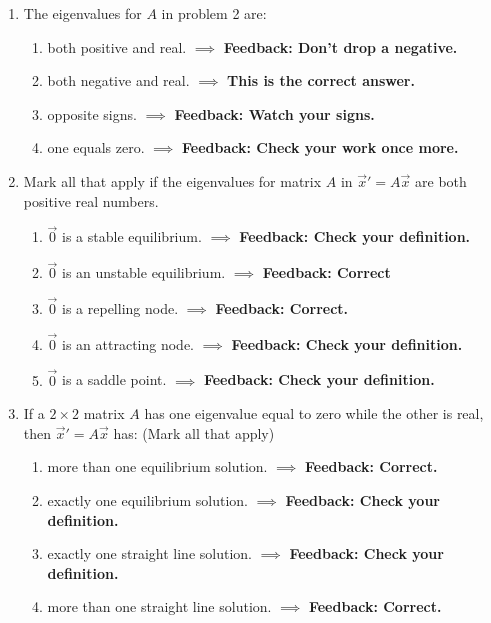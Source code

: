 \documentclass[11pt]{article}
\begin{document}
\begin{enumerate}
	\item The eigenvalues for $A$ in problem 2 are:
	\begin{enumerate}
		\item both positive and real. $\implies$ \textbf{Feedback: Don't drop a negative.}
		\item both negative and real. $\implies$ \textbf{This is the correct answer.}
		\item opposite signs. $\implies$ \textbf{Feedback: Watch your signs.}
		\item one equals zero. $\implies$ \textbf{Feedback: Check your work once more.}
	\end{enumerate}
	\item Mark all that apply if the eigenvalues for matrix $A$ in $\vec{x}' = A\vec{x}$ are both positive real numbers.
	\begin{enumerate}
		\item $\vec{0}$ is a stable equilibrium. $\implies$ \textbf{Feedback: Check your definition.}
		\item $\vec{0}$ is an unstable equilibrium. $\implies$ \textbf{Feedback: Correct}
		\item $\vec{0}$ is a repelling node. $\implies$ \textbf{Feedback: Correct.}
		\item $\vec{0}$ is an attracting node. $\implies$ \textbf{Feedback: Check your definition.}
		\item $\vec{0}$ is a saddle point. $\implies$ \textbf{Feedback: Check your definition.}
	\end{enumerate}
	\item If a $2\times 2$ matrix $A$ has one eigenvalue equal to zero while the other is real, then $\vec{x}' = A\vec{x}$ has: (Mark all that apply)
	\begin{enumerate}
		\item more than one equilibrium solution. $\implies$ \textbf{Feedback: Correct.}
		\item exactly one equilibrium solution. $\implies$ \textbf{Feedback: Check your definition.}
		\item exactly one straight line solution. $\implies$ \textbf{Feedback: Check your definition.}
		\item more than one straight line solution. $\implies$ \textbf{Feedback: Correct.}

\end{enumerate}
\end{enumerate}
\end{document}
